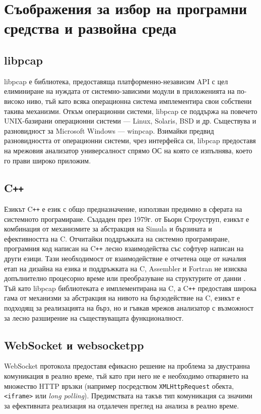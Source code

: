 \documentclass[12pt,a4paper,oneside]{book}
\begin{document}
\section{Съображения за избор на програмни средства и развойна среда}

\subsection{libpcap}

libpcap е библиотека, предоставяща платформенно-независим API с цел
елиминиране на нуждата от системно-зависими модули в приложенията на по-високо
ниво, тъй като всяка операционна система имплементира свои собствени такива
механизми. Откъм операционни системи, libpcap се поддържа на повечето UNIX-базирани
операционни системи --- Linux, Solaris, BSD и др. Съществува и разновидност за
Microsoft Windows --- winpcap. Взимайки предвид разновидността от
операционни системи, чрез интерфейса си, libpcap предоставя на мрежовия анализатор
универсалност спрямо ОС на която се изпълнява, което го прави широко приложим.

\subsection{C\texttt{++}}

Езикът C\texttt{++} е език с общо предназначение, използван предимно в сферата на
системното програмиране. Създаден през 1979г. от Бьорн Строуструп, езикът е
комбинация от механизмите за абстракция на Simula и бързината и
ефективността на C. Отчитайки поддръжката на системно програмиране,
програмния код написан на C\texttt{++} лесно взаимодейства със софтуер написан
на други езици. Тази необходимост от взаимодействие е отчетена още от началия
етап на дизайна на езика и поддръжката на C, Assembler и Fortran не изисква
допълнително процесорно време или преобразуване на структурите от данни
\cite{stroustrup_c++_2013}. Тъй като libpcap библиотеката е имплементирана на C,
а C\texttt{++} предоставя широка гама от механизми за абстракция
\cite{stroustrup_c++_2013} на нивото на бързодействие на C, езикът е подходящ за
реализацията на бърз, но и гъвкав мрежов анализатор с възможност за
лесно разширение на съществуващата функционалност.

\subsection{WebSocket и websocketpp}

WebSocket протокола предоставя ефикасно решение на проблема за двустранна комуникация в
реално време, тъй като при него не е необходимо отварянето на множество HTTP връзки
(например посредством \texttt{XMLHttpRequest} обекта, \texttt{<iframe>} или
\textit{long polling}). Предимствата на такъв тип комуникация са значими за
ефективната реализация на отдалечен преглед на анализа в реално време.
\end{document}

